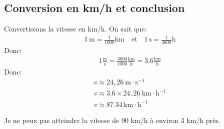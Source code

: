 \subsection{Conversion en km/h et conclusion}

Convertissons la vitesse en km/h. On sait que:
\begin{gather*}               
        \mathrm{1\,m = \frac{1}{1000}km} \quad \text{et} \quad
        \mathrm{1\,s = \frac{1}{3600}h}
\end{gather*}
Donc:
\begin{gather*}               
        \mathrm{1\frac{m}{s} = \frac{3600}{1000}\frac{km}{h}=\num{3.6}\frac{km}{h}}
\end{gather*}
Donc:
{\setlength{\jot}{10pt}
\begin{gather*}
        v \approx 24{,}26\ \mathrm{m \cdot s^{-1}} \\
        v \approx \num{3.6} \times 24{,}26\ \mathrm{km \cdot h^{-1}} \\
        \boxed{v \approx \mathrm{\num{87,34}\,\mathrm{km \cdot h^{-1}}}}
\end{gather*}}

Je ne peux pas atteindre la vitesse de 90 km/h à environ 3 km/h près.